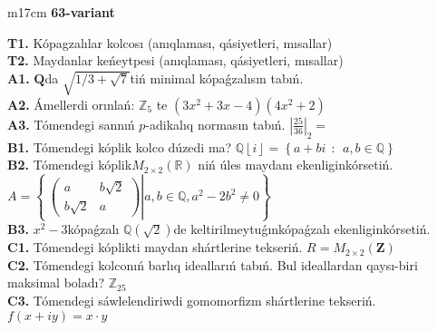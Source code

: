 \documentclass{article}
\begin{document}
\begin{tabular}{m{17cm}}
\textbf{63-variant}
\newline

\textbf{T1.} Kópagzalılar kolcosı (anıqlaması, qásiyetleri, mısallar) \\
\textbf{T2.} Maydanlar keńeytpesi (anıqlaması, qásiyetleri, mısallar) \\
\textbf{A1.} \(\mathbf{Q}\)da \(\sqrt{1/3 + \sqrt{7}}\)tiń minimal kópaǵzalısın tabıń. \\
\textbf{A2.} Ámellerdi orınlań: \(\mathbb{Z}_{5}\) te \(\left( 3x^{2} + 3x - 4 \right)\left( 4x^{2} + 2 \right)\) \\
\textbf{A3.} Tómendegi sannıń \(p\)-adikalıq normasın tabıń. \(|\frac{25}{36}|_{2} =\) \\
\textbf{B1.} Tómendegi kóplik kolco dúzedi ma? \(\mathbb{Q}\left\lfloor i \right\rfloor = \left\{ a + bi\ \ :\ \ a,b\mathbb{\in Q} \right\}\) \\
\textbf{B2.} Tómendegi kóplik\(M_{2 \times 2}\left( \mathbb{R} \right)\) niń úles maydanı ekenliginkórsetiń. \(A = \left\{ \left. \ \begin{pmatrix}
a & b\sqrt{2} \\
b\sqrt{2} & a
\end{pmatrix} \right|a,b\mathbb{\in Q},a^{2} - 2b^{2} \neq 0 \right\}\) \\
\textbf{B3.} \(x^{2} - 3\)kópaǵzalı \(\mathbb{Q}(\sqrt{2})\)de keltirilmeytuǵınkópaǵzalı ekenliginkórsetiń. \\
\textbf{C1.} Tómendegi kóplikti maydan shártlerine tekseriń. \(R = M_{2 \times 2}\left( \mathbf{Z} \right)\) \\
\textbf{C2.} Tómendegi kolconıń barlıq ideallarıń tabıń. Bul ideallardan qaysı-biri maksimal boladı? \(\mathbb{Z}_{25}\) \\
\textbf{C3.} Tómendegi sáwlelendiriwdi gomomorfizm shártlerine tekseriń. \(f(x + iy) = x \cdot y\) \\

\end{tabular}
\vspace{1cm}
\end{document}
